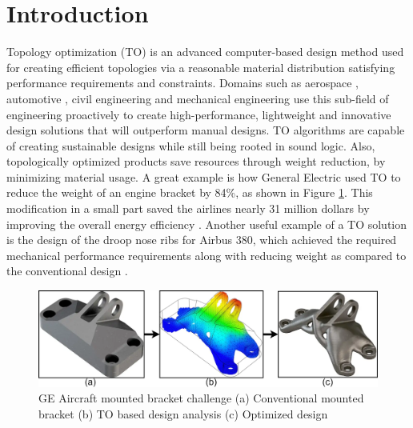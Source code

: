 \section{Introduction}

Topology optimization (TO) is an advanced computer-based design method used for creating efficient topologies via a reasonable material distribution satisfying performance requirements and constraints. Domains such as aerospace \parencite{zhu2016topology}, automotive \parencite{jankovics2019customization}, civil engineering \parencite{jewett2019topology} and mechanical engineering \parencite{guanghui2020aerospace, ZHU202191} use this sub-field of engineering proactively to create high-performance, lightweight and innovative design solutions that will outperform manual designs. TO algorithms are capable of creating sustainable designs while still being rooted in sound logic. Also, topologically optimized products save resources through weight reduction, by minimizing material usage. A great example is how General Electric used TO to reduce the weight of an engine bracket by 84\%, as shown in Figure \ref{fig:MDP_Fig1_mounted_bracket}. This modification in a small part saved the airlines nearly 31 million dollars by improving the overall energy efficiency \parencite{morgan2014ge}. Another useful example of a TO solution is the design of the droop nose ribs for Airbus 380, which achieved the required mechanical performance requirements along with reducing weight as compared to the conventional design \parencite{krog2002application}.

\begin{figure}[h!]
    \centering
    \includegraphics[width=\textwidth]{Figures/Ch_MDP/Fig1_mounted_bracket.png}
    \caption{GE Aircraft mounted bracket challenge \parencite{morgan2014ge} (a) Conventional mounted bracket (b) TO based design analysis (c) Optimized design}
    \label{fig:MDP_Fig1_mounted_bracket}
\end{figure}

